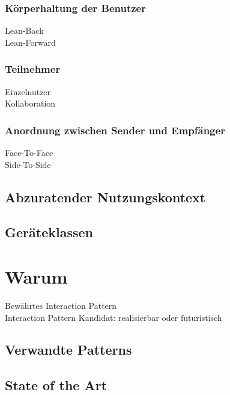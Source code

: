 \subsubsection*{Körperhaltung der Benutzer}
\checkbox{\leanback} Lean-Back \\
\checkbox{\leanforward} Lean-Forward 

\subsubsection*{Teilnehmer}
\checkbox{\single} Einzelnutzer \\
\checkbox{\collaboration} Kollaboration

\subsubsection*{Anordnung zwischen Sender und Empfänger}
\checkbox{\facetoface} Face-To-Face \\
\checkbox{\sidetoside} Side-To-Side

\subsection*{Abzuratender Nutzungskontext}
\notvalidcontext

\subsection*{Geräteklassen}
\devicetabular



\section*{Warum}
\checkbox{\established} Bewährtes Interaction Pattern \\
\checkbox{\candidate} Interaction Pattern Kandidat: 
\checkbox{\realizable} realisierbar oder
\checkbox{\futuristic} futuristisch

\subsection*{Verwandte Patterns}
\otherpatterns

\subsection*{State of the Art}
\stateoftheart

